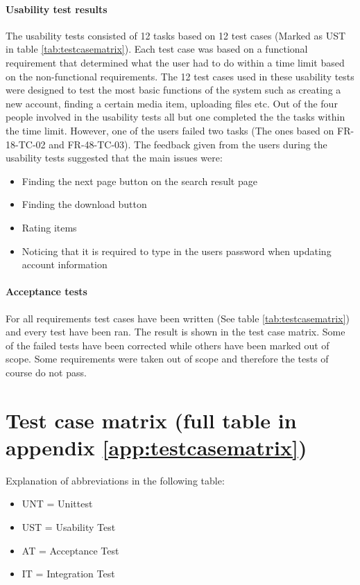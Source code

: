 \documentclass[../report.tex]{subfiles}
\begin{document}
\paragraph{Usability test results}
The usability tests consisted of 12 tasks based on 12 test cases (Marked as UST in table \ref{tab:testcasematrix}). Each test case was based on a functional requirement that determined what the user had to do within a time limit based on the non-functional requirements. The 12 test cases used in these usability tests were designed to test the most basic functions of the system such as creating a new account, finding a certain media item, uploading files etc. 
Out of the four people involved in the usability tests all but one completed the the tasks within the time limit. However, one of the users failed two tasks (The ones based on FR-18-TC-02 and FR-48-TC-03). The feedback given from the users during the usability tests suggested that the main issues were:
\begin{itemize}
\item Finding the next page button on the search result page
\item Finding the download button
\item Rating items
\item Noticing that it is required to type in the users password when updating account information
\end{itemize} 

\paragraph{Acceptance tests}
For all requirements test cases have been written (See table \ref{tab:testcasematrix}) and every test have been ran. The result is shown in the test case matrix. Some of the failed tests have been corrected while others have been marked out of scope. Some requirements were taken out of scope and therefore the tests of course do not pass.



\section{Test case matrix (full table in appendix \ref{app:testcasematrix})}

Explanation of abbreviations in the following table:
\begin{itemize}
\item UNT = Unittest
\item UST = Usability Test
\item AT = Acceptance Test
\item IT = Integration Test
\end{itemize}
\end{document}
